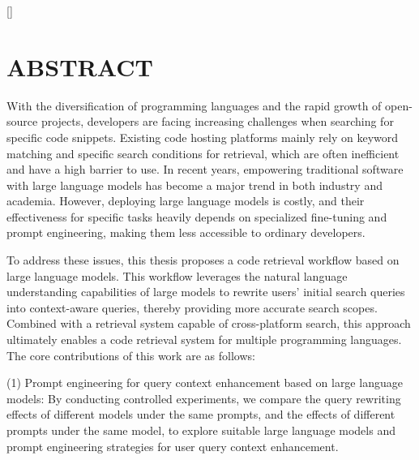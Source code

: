 \documentclass[UTF8,a4paper,12pt]{ctexart}
\numberwithin{equation}{section}
\renewcommand\thesection{\arabic{section}}
\begin{document}
\newpage
{}

\titleformat{\section}[block]{\centering\bfseries\fontspec{Times New Roman}\fontsize{16pt}{20pt}\selectfont}{\thesection}{1em}{}[]

\section*{ABSTRACT}
With the diversification of programming languages and the rapid growth of open-source projects, developers are facing increasing challenges when searching for specific code snippets. Existing code hosting platforms mainly rely on keyword matching and specific search conditions for retrieval, which are often inefficient and have a high barrier to use. In recent years, empowering traditional software with large language models has become a major trend in both industry and academia. However, deploying large language models is costly, and their effectiveness for specific tasks heavily depends on specialized fine-tuning and prompt engineering, making them less accessible to ordinary developers.\par

To address these issues, this thesis proposes a code retrieval workflow based on large language models. This workflow leverages the natural language understanding capabilities of large models to rewrite users’ initial search queries into context-aware queries, thereby providing more accurate search scopes. Combined with a retrieval system capable of cross-platform search, this approach ultimately enables a code retrieval system for multiple programming languages. The core contributions of this work are as follows:\par

(1) Prompt engineering for query context enhancement based on large language models: By conducting controlled experiments, we compare the query rewriting effects of different models under the same prompts, and the effects of different prompts under the same model, to explore suitable large language models and prompt engineering strategies for user query context enhancement.\par
\end{document}
